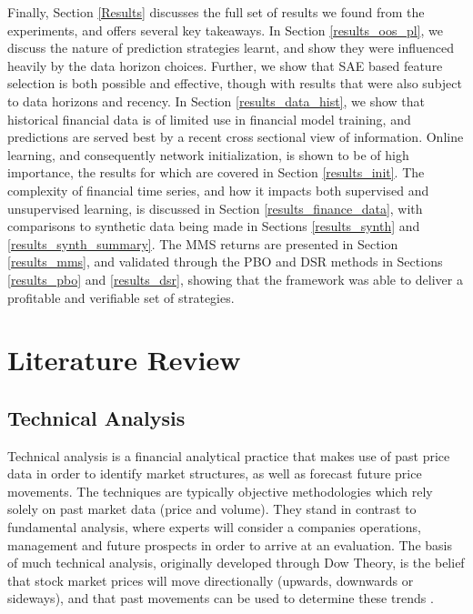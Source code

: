 \documentclass[a4paper,11pt,oneside]{article}
\theoremstyle{plain}
\theoremstyle{definition}
\begin{document}
	Finally, Section \ref{Results} discusses the full set of results we found from the experiments, and offers several key takeaways. In Section \ref{results_oos_pl}, we discuss the nature of prediction strategies learnt, and show they were influenced heavily by the data horizon choices. Further, we show that SAE based feature selection is both possible and effective, though with results that were also subject to data horizons and recency. In Section \ref{results_data_hist}, we show that historical financial data is of limited use in financial model training, and predictions are served best by a recent cross sectional view of information. Online learning, and consequently network initialization, is shown to be of high importance, the results for which are covered in Section \ref{results_init}. The complexity of financial time series, and how it impacts both supervised and unsupervised learning, is discussed in Section \ref{results_finance_data}, with comparisons to synthetic data being made in Sections \ref{results_synth} and \ref{results_synth_summary}. The MMS returns are presented in Section \ref{results_mms}, and validated through the PBO and DSR methods in Sections \ref{results_pbo} and \ref{results_dsr}, showing that the framework was able to deliver a profitable and verifiable set of strategies.


	
	
	\newpage
	\section{Literature Review}\label{lr_LiteratureReview}
	\subsection{Technical Analysis}\label{lr_TechnicalAnalysis}
	
	Technical analysis is a financial analytical practice that makes use of past price data in order to identify market 
	structures, as well as forecast future price movements. The techniques are typically objective methodologies 
	which rely solely on past market data (price and volume). They stand in contrast to fundamental analysis, where 
	experts will consider a companies operations, management and future prospects in order to arrive at an evaluation. 
	The basis of much technical analysis, originally developed through Dow Theory, is the belief that stock market 
	prices will move directionally (upwards, downwards or sideways), and that past movements can be used to 
	determine these trends \citep{Murphy}.
	\hfill \break 
	
\end{document}
